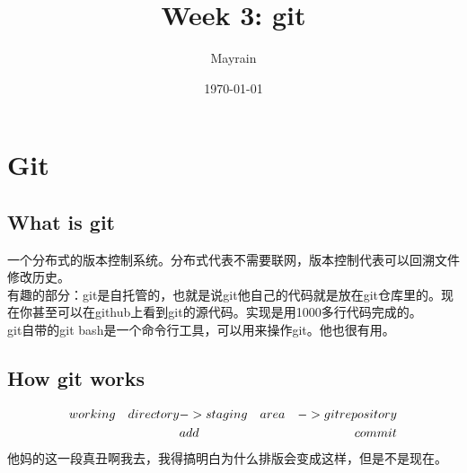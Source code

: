 \documentclass{article}
\title{Week 3: git}
\author{Mayrain}
\date{\today}
\begin{document}
\maketitle

\section{Git}

\subsection{What is git}

\noindent
一个分布式的版本控制系统。分布式代表不需要联网，版本控制代表可以回溯文件修改历史。\\
有趣的部分：git是自托管的，也就是说git他自己的代码就是放在git仓库里的。现在你甚至可以在github上看到git的源代码。实现是用1000多行代码完成的。\\
git自带的git bash是一个命令行工具，可以用来操作git。他也很有用。\\

\subsection{How git works}

\noindent
\begin{align}
    working\quad directory & -> staging\quad area & ->  git  repository \notag \\
                           & add                  & commit \notag
\end{align}
他妈的这一段真丑啊我去，我得搞明白为什么排版会变成这样，但是不是现在。
\end{document}
